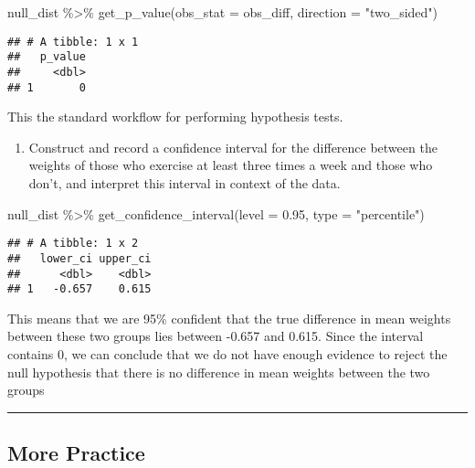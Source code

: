\documentclass[
]{article}
\newenvironment{Shaded}{\begin{snugshade}}{\end{snugshade}}
\newcommand{\AttributeTok}[1]{\textcolor[rgb]{0.77,0.63,0.00}{#1}}
\newcommand{\FloatTok}[1]{\textcolor[rgb]{0.00,0.00,0.81}{#1}}
\newcommand{\FunctionTok}[1]{\textcolor[rgb]{0.00,0.00,0.00}{#1}}
\newcommand{\NormalTok}[1]{#1}
\newcommand{\SpecialCharTok}[1]{\textcolor[rgb]{0.00,0.00,0.00}{#1}}
\newcommand{\StringTok}[1]{\textcolor[rgb]{0.31,0.60,0.02}{#1}}
\providecommand{\tightlist}{%
  \setlength{\itemsep}{0pt}\setlength{\parskip}{0pt}}
\begin{document}
\begin{Shaded}
\begin{Highlighting}[]
\NormalTok{null\_dist }\SpecialCharTok{\%\textgreater{}\%}
  \FunctionTok{get\_p\_value}\NormalTok{(}\AttributeTok{obs\_stat =}\NormalTok{ obs\_diff, }\AttributeTok{direction =} \StringTok{"two\_sided"}\NormalTok{)}
\end{Highlighting}
\end{Shaded}

\begin{verbatim}
## # A tibble: 1 x 1
##   p_value
##     <dbl>
## 1       0
\end{verbatim}

This the standard workflow for performing hypothesis tests.

\begin{enumerate}
\def\labelenumi{\arabic{enumi}.}
\setcounter{enumi}{6}
\tightlist
\item
  Construct and record a confidence interval for the difference between
  the weights of those who exercise at least three times a week and
  those who don't, and interpret this interval in context of the data.
\end{enumerate}

\begin{Shaded}
\begin{Highlighting}[]
\NormalTok{null\_dist }\SpecialCharTok{\%\textgreater{}\%}
  \FunctionTok{get\_confidence\_interval}\NormalTok{(}\AttributeTok{level =} \FloatTok{0.95}\NormalTok{, }\AttributeTok{type =} \StringTok{"percentile"}\NormalTok{)}
\end{Highlighting}
\end{Shaded}

\begin{verbatim}
## # A tibble: 1 x 2
##   lower_ci upper_ci
##      <dbl>    <dbl>
## 1   -0.657    0.615
\end{verbatim}

This means that we are 95\% confident that the true difference in mean
weights between these two groups lies between -0.657 and 0.615. Since
the interval contains 0, we can conclude that we do not have enough
evidence to reject the null hypothesis that there is no difference in
mean weights between the two groups

\begin{center}\rule{0.5\linewidth}{0.5pt}\end{center}

\hypertarget{more-practice}{%
\subsection{More Practice}\label{more-practice}}
\end{document}
